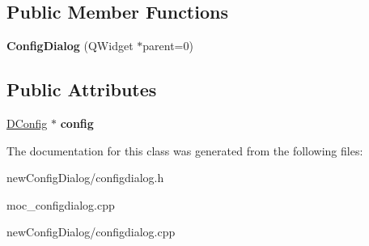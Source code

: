 \subsection*{Public Member Functions}
\begin{DoxyCompactItemize}
\item 
\hypertarget{class_config_dialog_ad16df8ed2e55bd5cc55e3ef9040b8b93}{
{\bfseries ConfigDialog} (QWidget $\ast$parent=0)}
\label{class_config_dialog_ad16df8ed2e55bd5cc55e3ef9040b8b93}

\end{DoxyCompactItemize}
\subsection*{Public Attributes}
\begin{DoxyCompactItemize}
\item 
\hypertarget{class_config_dialog_a5ba7da0f4b32f7b2626d7a66631b4abb}{
\hyperlink{class_d_config}{DConfig} $\ast$ {\bfseries config}}
\label{class_config_dialog_a5ba7da0f4b32f7b2626d7a66631b4abb}

\end{DoxyCompactItemize}


The documentation for this class was generated from the following files:\begin{DoxyCompactItemize}
\item 
newConfigDialog/configdialog.h\item 
moc\_\-configdialog.cpp\item 
newConfigDialog/configdialog.cpp\end{DoxyCompactItemize}
